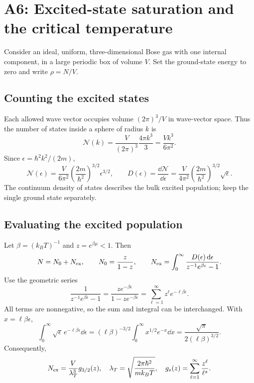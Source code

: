 \section{A6: Excited-state saturation and the critical temperature}
Consider an ideal, uniform, three-dimensional Bose gas with one internal component, in a large periodic box of volume $V$. Set the ground-state energy to zero and write $\rho=N/V$.

\subsection*{Counting the excited states}
Each allowed wave vector occupies volume $(2\pi)^3/V$ in wave-vector space. Thus the number of states inside a sphere of radius $k$ is
\[
\mathcal N(k)=\frac{V}{(2\pi)^3}\frac{4\pi k^3}{3}
=\frac{Vk^3}{6\pi^2}.
\]
Since $\epsilon=\hbar^2k^2/(2m)$,
\[
\mathcal N(\epsilon)=\frac{V}{6\pi^2}
\left(\frac{2m}{\hbar^2}\right)^{3/2}\epsilon^{3/2},
\qquad
D(\epsilon)=\frac{\dd\mathcal N}{\dd\epsilon}
=\frac{V}{4\pi^2}\left(\frac{2m}{\hbar^2}\right)^{3/2}\sqrt{\epsilon}.
\]
The continuum density of states describes the bulk excited population; keep the single ground state separately.

\subsection*{Evaluating the excited population}
Let $\beta=(k_BT)^{-1}$ and $z=e^{\beta\mu}<1$. Then
\[
N=N_0+N_{\rm ex},\qquad N_0=\frac{z}{1-z},
\qquad
N_{\rm ex}=\int_0^\infty
\frac{D(\epsilon)\,\mathrm{d}\epsilon}{z^{-1}e^{\beta\epsilon}-1}.
\]
Use the geometric series
\[
\frac{1}{z^{-1}e^{\beta\epsilon}-1}
=\frac{ze^{-\beta\epsilon}}{1-ze^{-\beta\epsilon}}
=\sum_{\ell=1}^\infty z^\ell e^{-\ell\beta\epsilon}.
\]
All terms are nonnegative, so the sum and integral can be interchanged. With $x=\ell\beta\epsilon$,
\[
\int_0^\infty \sqrt{\epsilon}\,e^{-\ell\beta\epsilon}\dd\epsilon
=(\ell\beta)^{-3/2}\int_0^\infty x^{1/2}e^{-x}\dd x
=\frac{\sqrt{\pi}}{2(\ell\beta)^{3/2}}.
\]
Consequently,
\[
N_{\rm ex}=\frac{V}{\lambda_T^3}g_{3/2}(z),
\quad
\lambda_T=\sqrt{\frac{2\pi\hbar^2}{mk_BT}},
\quad
g_s(z)=\sum_{\ell=1}^\infty\frac{z^\ell}{\ell^s}.
\]


